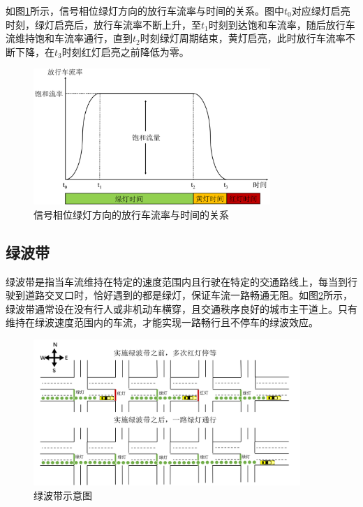 如图\ref{fig:baoheliulv}所示，信号相位绿灯方向的放行车流率与时间的关系。图中${t_0}$对应绿灯启亮时刻，绿灯启亮后，放行车流率不断上升，至${t_1}$时刻到达饱和车流率，随后放行车流维持饱和车流率通行，直到${t_2}$时刻绿灯周期结束，黄灯启亮，此时放行车流率不断下降，在${t_3}$时刻红灯启亮之前降低为零。


\begin{figure}[ht]
	\centering
	\includegraphics[width=0.8\textwidth]{figures/baoheliulv.png}
	\caption{信号相位绿灯方向的放行车流率与时间的关系}
	\label{fig:baoheliulv}
\end{figure}


\subsection{绿波带}

绿波带是指当车流维持在特定的速度范围内且行驶在特定的交通路线上，每当到行驶到道路交叉口时，恰好遇到的都是绿灯，保证车流一路畅通无阻\cite{zhaoyi,ma2019green}。如图\ref{fig:greenwave}所示，绿波带通常设在没有行人或非机动车横穿，且交通秩序良好的城市主干道上。只有维持在绿波速度范围内的车流，才能实现一路畅行且不停车的绿波效应。
\begin{figure}[ht]
	\centering
	\includegraphics[width=0.9\textwidth]{figures/greenwave.png}
	\caption{绿波带示意图}
	\label{fig:greenwave}
\end{figure}

